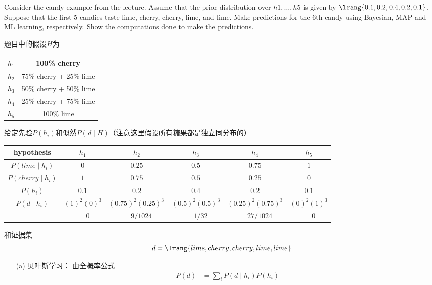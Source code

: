 \documentclass[a4paper, 11pt]{article}
\begin{document}
\begin{question}\normalfont
Consider the candy example from the lecture. Assume that the prior distribution over $h1, \ldots, h5$ is given by $\lrang{0.1, 0.2, 0.4, 0.2, 0.1}$. Suppose that the first 5 candies taste lime, cherry, cherry, lime, and lime. Make predictions for the 6th candy using Bayesian, MAP and ML learning, respectively. Show
the computations done to make the predictions.
\end{question}
\begin{answer}
    题目中的假设$H$为
    \begin{center}
        \begin{tabular}{|c|c|}\hline
            $h_1$ & 100\% cherry\\\hline
            $h_2$ & 75\% cherry + 25\%  lime\\\hline
            $h_3$ & 50\% cherry + 50\% lime\\\hline
            $h_4$ & 25\% cherry + 75\% lime\\\hline
            $h_5$ & 100\% lime\\\hline
        \end{tabular}
    \end{center}
    给定先验$P(h_i)$和似然$P(d\mid H)$（注意这里假设所有糖果都是独立同分布的）
    \begin{center}
    \begin{tabular}{|c|c|c|c|c|c|}\hline
        hypothesis & $h_1$ & $h_2$ & $h_3$ & $h_4$ & $h_5$\\\hline
        $P(lime\mid h_i)$ & $0$ & $0.25$ & $0.5$ & $0.75$ & $1$\\\hline
        $P(cherry\mid h_i)$ & $1$ & $0.75$ & $0.5$ & $0.25$ & $0$\\\hline
        $P(h_i)$ & $0.1$ & $0.2$ & $0.4$ & 0.2 & $0.1$\\\hline
        $P(d\mid h_i)$ & $(1)^2(0)^3$ & $(0.75)^2(0.25)^3$ & $(0.5)^2(0.5)^3$ & $(0.25)^2(0.75)^3$ & $(0)^2(1)^3$\\
        & $=0$ & $=9/1024$ & $=1/32$ & $=27/1024$ & $=0$\\\hline
    \end{tabular}
    \end{center}
    和证据集
    \[d=\lrang{lime, cherry, cherry, lime, lime}\]
\begin{itemize}
    \item [(a)] 贝叶斯学习：
    由全概率公式
    \[\begin{aligned}
        P(d)&=\sum_i P(d\mid h_i)P(h_i)\\

\end{aligned}\]
\end{itemize}
\end{answer}
\end{document}

